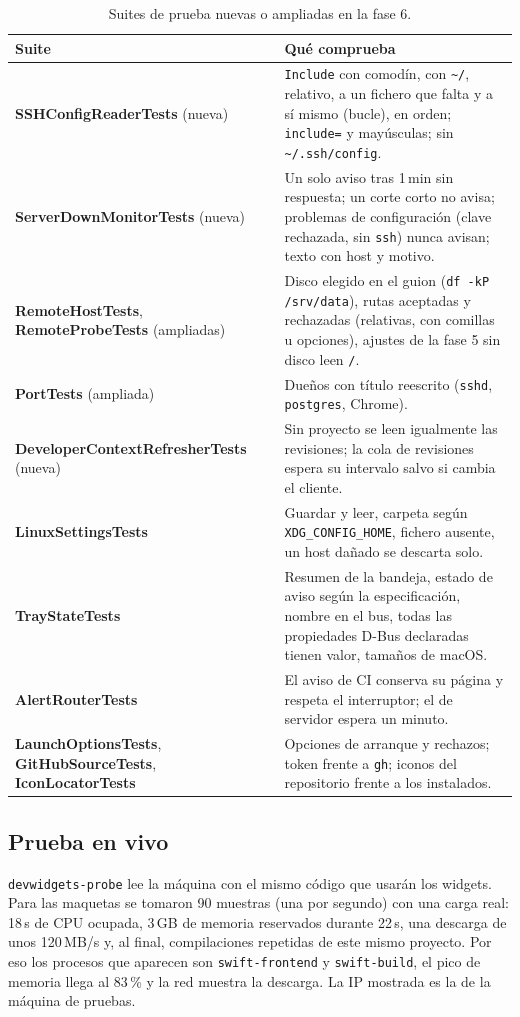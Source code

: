 \documentclass[11pt,a4paper]{article}
\begin{document}
\begin{table}[H]
\centering
\begin{tabularx}{\textwidth}{@{}lX@{}}
\toprule
\textbf{Suite} & \textbf{Qué comprueba}\\
\midrule
\textbf{SSHConfigReaderTests} (nueva) & \texttt{Include} con
comodín, con \texttt{\textasciitilde/}, relativo, a un fichero que
falta y a sí mismo (bucle), en orden; \texttt{include=} y
mayúsculas; sin \texttt{\textasciitilde/.ssh/config}.\\
\textbf{ServerDownMonitorTests} (nueva) & Un solo aviso tras 1\,min
sin respuesta; un corte corto no avisa; problemas de configuración
(clave rechazada, sin \texttt{ssh}) nunca avisan; texto con host y
motivo.\\
\textbf{RemoteHostTests}, \textbf{RemoteProbeTests} (ampliadas) &
Disco elegido en el guion (\texttt{df -kP /srv/data}), rutas
aceptadas y rechazadas (relativas, con comillas u opciones), ajustes
de la fase 5 sin disco leen \texttt{/}.\\
\textbf{PortTests} (ampliada) & Dueños con título reescrito
(\texttt{sshd}, \texttt{postgres}, Chrome).\\
\textbf{DeveloperContextRefresherTests} (nueva) & Sin proyecto se
leen igualmente las revisiones; la cola de revisiones espera su
intervalo salvo si cambia el cliente.\\
\textbf{LinuxSettingsTests} & Guardar y leer, carpeta según
\texttt{XDG\_CONFIG\_HOME}, fichero ausente, un host dañado se
descarta solo.\\
\textbf{TrayStateTests} & Resumen de la bandeja, estado de aviso
según la especificación, nombre en el bus, todas las propiedades
D-Bus declaradas tienen valor, tamaños de macOS.\\
\textbf{AlertRouterTests} & El aviso de CI conserva su página y
respeta el interruptor; el de servidor espera un minuto.\\
\textbf{LaunchOptionsTests}, \textbf{GitHubSourceTests},
\textbf{IconLocatorTests} & Opciones de arranque y rechazos; token
frente a \texttt{gh}; iconos del repositorio frente a los
instalados.\\
\bottomrule
\end{tabularx}
\caption{Suites de prueba nuevas o ampliadas en la fase 6.}
\end{table}

\subsection{Prueba en vivo}
\texttt{devwidgets-probe} lee la máquina con el mismo código que
usarán los widgets. Para las maquetas se tomaron 90 muestras (una por
segundo) con una carga real: 18\,s de CPU ocupada, 3\,GB de memoria
reservados durante 22\,s, una descarga de unos 120\,MB/s y, al final,
compilaciones repetidas de este mismo proyecto. Por eso los procesos
que aparecen son \texttt{swift-frontend} y \texttt{swift-build}, el
pico de memoria llega al 83\,\% y la red muestra la descarga. La IP
mostrada es la de la máquina de pruebas.
\end{document}
